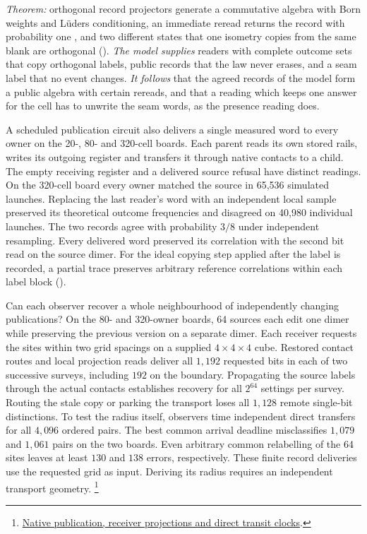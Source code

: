 \documentclass[11pt]{article}
\theoremstyle{definition}
\theoremstyle{remark}
\theoremstyle{plain}
\begin{document}
\begin{description}[leftmargin=1.2em,itemsep=3pt]
\item[Records.] \emph{Theorem:} orthogonal record projectors generate a
commutative algebra with Born weights and L\"uders conditioning, an
immediate reread returns the record with probability one
\cite{ophconsensus}, and two different states that one isometry copies
from the same blank are orthogonal
(). \emph{The
model supplies} readers with complete outcome sets that copy orthogonal
labels, public records that the law never erases, and a seam label that no
event changes. \emph{It follows} that the agreed records of the model form
a public algebra with certain rereads, and that a reading which keeps one
answer for the cell has to unwrite the seam words, as the presence reading
does.

A scheduled publication circuit also delivers a single measured
word to every owner on the 20-, 80- and 320-cell boards. Each parent
reads its own stored rails, writes its outgoing register and transfers
it through native contacts to a child. The empty receiving register
and a delivered source refusal have distinct readings. On the
320-cell board every owner matched the source in 65,536 simulated
launches. Replacing the last reader's word with an independent local
sample preserved its theoretical outcome frequencies and disagreed on
40,980 individual launches. The two records agree with probability
$3/8$ under independent resampling. Every delivered word preserved its
correlation with the second bit read on the source dimer. For the
ideal copying step applied after the label is recorded, a partial trace
preserves arbitrary reference correlations within each label block
().

Can each observer recover a whole neighbourhood of independently
changing publications? On the 80- and 320-owner boards, 64 sources
each edit one dimer while preserving the previous version on a separate
dimer. Each receiver requests the sites within two grid spacings on
a supplied $4\times4\times4$ cube. Restored contact routes and local
projection reads deliver all $1{,}192$ requested bits in each of two
successive surveys, including $192$ on the boundary. Propagating the
source labels through the actual contacts establishes recovery for all
$2^{64}$ settings per survey. Routing the stale copy or parking the
transport loses all $1{,}128$ remote single-bit distinctions. To test
the radius itself, observers time independent direct transfers for all
$4{,}096$ ordered pairs. The best common arrival deadline misclassifies
$1{,}079$ and $1{,}061$ pairs on the two boards. Even arbitrary common
relabelling of the 64 sites leaves at least $130$ and $138$ errors,
respectively. These finite record deliveries use the requested grid as
input. Deriving its radius requires an independent transport geometry.%
\footnote{\href{https://github.com/FloatingPragma/observer-patch-holography/tree/main/model/experiments/interval_echo_consensus/record_lowering/dense_readout}{Native publication, receiver projections and direct transit clocks}.}


\end{description}
\end{document}
